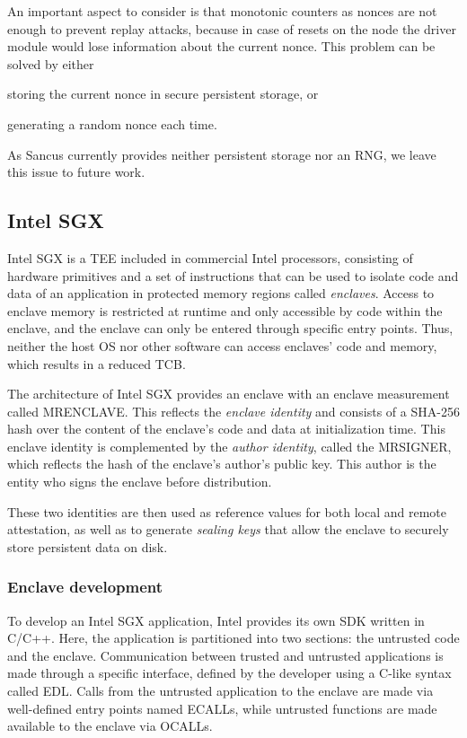 An important aspect to consider is that monotonic counters as nonces are not
enough to prevent replay attacks, because in case of resets on the node the
driver module would lose information about the current nonce. This problem can
be solved by either
%
\begin{paraenum}
  \item storing the current nonce in secure persistent storage, or
  \item generating a random nonce each time.
\end{paraenum}
%
As Sancus currently provides neither persistent storage nor an RNG, we
leave this issue to future work.

\subsection{Intel SGX}
\label{impl:sgx}

Intel \ac{SGX} is a \ac{TEE} included in commercial Intel processors, consisting
of hardware primitives and a set of instructions that can be used to isolate
code and data of an application in protected memory regions called
\emph{enclaves}.  Access to enclave memory is restricted at runtime and only
accessible by code within the enclave, and the enclave can only be entered
through specific entry points. Thus, neither the host OS nor other software can
access enclaves' code and memory, which results in a reduced \ac{TCB}. 

The architecture of Intel \ac{SGX} provides an enclave with an enclave
measurement called MRENCLAVE. This reflects the \emph{enclave identity} and
consists of a SHA-256 hash over the content of the enclave's code and data at
initialization time. This enclave identity is complemented by the \emph{author
identity}, called the MRSIGNER, which reflects the hash of the enclave's
author's public key. This author is the entity who signs the enclave before
distribution. 

These two identities are then used as reference values for both local and remote
attestation, as well as to generate \emph{sealing keys} that allow the enclave
to securely store persistent data on disk.

\subsubsection{Enclave development}

To develop an Intel \ac{SGX} application, Intel provides its own SDK written in
C/C++. Here, the application is partitioned into two sections: the untrusted
code and the enclave. Communication between trusted and untrusted applications
is made through a specific interface, defined by the developer using a C-like
syntax called \ac{EDL}. Calls from the untrusted application to the enclave are
made via well-defined entry points named ECALLs, while untrusted functions are
made available to the enclave via OCALLs.

